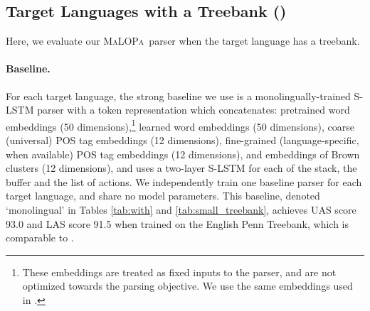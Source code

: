 \documentclass[11pt]{article}
\newcommand{\malopa}{\textsc{MaLOPa}}
\begin{document}
\subsection{Target Languages with a Treebank ()}
\label{sec:with}
Here, we evaluate our \malopa~parser when the target language has a treebank.

\paragraph{Baseline.} For each target language, the strong baseline we use is a monolingually-trained S-LSTM parser with a token representation which concatenates: pretrained word embeddings (50 dimensions),\footnote{These embeddings are treated as fixed inputs to the parser, and are not optimized towards the parsing objective. We use the same embeddings used in .} learned word embeddings (50 dimensions), coarse (universal) POS tag embeddings (12 dimensions), fine-grained (language-specific, when available) POS tag embeddings (12 dimensions), and embeddings of Brown clusters (12 dimensions), and uses a two-layer S-LSTM for each of the stack, the buffer and the list of actions.
We independently train one baseline parser for each target language, and share no model parameters.
This baseline, denoted `monolingual' in Tables \ref{tab:with} and \ref{tab:small_treebank}, achieves UAS score 93.0 and LAS score 91.5 when trained on the English Penn Treebank, which is comparable to .
\end{document}
